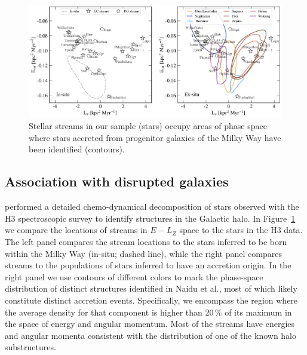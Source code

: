 \documentclass[twocolumn]{aastex63}
\begin{document}
\begin{figure}
\begin{center}
\includegraphics[width=\textwidth]{stream_hosts.pdf}
\end{center}
\caption{
Stellar streams in our sample (stars) occupy areas of phase space where stars accreted from progenitor galaxies of the Milky Way have been identified (contours).
}
\label{fig:hosts}
\end{figure}

\subsection{Association with disrupted galaxies}
\label{sec:hosts}

\citet{naidu2020} performed a detailed chemo-dynamical decomposition of stars observed with the H3 spectroscopic survey to identify structures in the Galactic halo.
In Figure~\ref{fig:hosts} we compare the locations of streams in $E-L_Z$ space to the stars in the H3 data.  
The left panel compares the stream locations to the stars inferred to be born within the Milky Way (in-situ; dashed line), while the right panel compares streams to the populations of stars inferred to have an accretion origin.  
In the right panel we use contours of different colors to mark the phase-space distribution of distinct structures identified in Naidu et al., most of which likely constitute distinct accretion events.
Specifically, we encompass the region where the average density for that component is higher than 20\,\% of its maximum in the space of energy and angular momentum.
Most of the streams have energies and angular momenta consistent with the distribution of one of the known halo substructures.  
\end{document}
